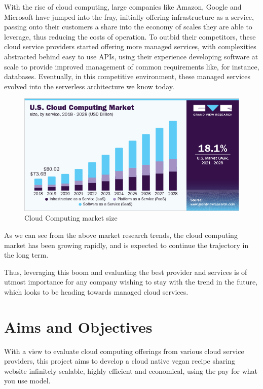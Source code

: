 \smallskip 

With the rise of cloud computing, large companies like Amazon, Google and Microsoft have jumped into the fray, initially offering infrastructure as a service, passing onto their customers a share into the economy of scales they are able to leverage, thus reducing the costs of operation. To outbid their competitors, these cloud service providers started offering more managed services, with complexities abstracted behind easy to use APIs, using their experience developing software at scale to provide improved management of common requirements like, for instance, databases. Eventually, in this competitive environment, these managed services evolved into the serverless architecture we know today.  

\begin{figure}[!hb]
\centering
\caption[Cloud Computing market size]{Cloud Computing market size}%
\label{fig:cloud_computing_market_size}
\includegraphics[width=\linewidth,height=\textheight,keepaspectratio]{img/cloud_computing_market_size}
\end{figure} 

As we can see from the above market research trends, the cloud computing market has been growing rapidly, and is expected to continue the trajectory in the long term. 

Thus, leveraging this boom and evaluating the best provider and services is of utmost importance for any company wishing to stay with the trend in the future, which looks to be heading towards managed cloud services. 

\section{Aims and Objectives} 

With a view to evaluate cloud computing offerings from various cloud service providers, this project aims to develop a cloud native vegan recipe sharing website infinitely scalable, highly efficient and economical, using the pay for what you use model. 

